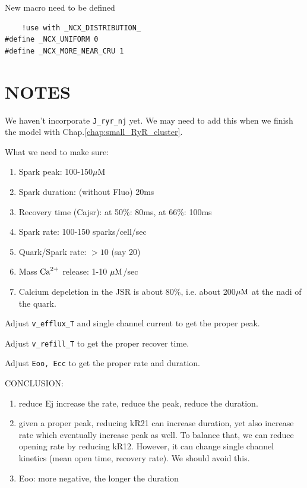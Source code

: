New macro need to be defined
\begin{verbatim}
    !use with _NCX_DISTRIBUTION_
#define _NCX_UNIFORM 0
#define _NCX_MORE_NEAR_CRU 1
\end{verbatim}


%     



\section{NOTES}

We haven't incorporate \verb!J_ryr_nj! yet. We may need to add this when we
finish the model with Chap.\ref{chap:small_RyR_cluster}.

What we need to make sure:
\begin{enumerate}
  \item Spark peak: 100-150$\mu$M
  \item Spark duration: (without Fluo) 20ms
  \item Recovery time (Cajsr): at 50\%: 80ms, at 66\%: 100ms
  \item Spark rate: 100-150 sparks/cell/sec
  \item Quark/Spark rate: $> 10$ (say 20)
  \item Mass ${\text{Ca}^{2+}}$ release: 1-10 ${\mu\text{M}}$/sec
  \item Calcium depeletion in the JSR is about 80\%, i.e. about 200${\mu\text{M}}$ at the
  nadi of the quark.
\end{enumerate}
Adjust \verb!v_efflux_T! and single channel current to get the proper peak.

Adjust \verb!v_refill_T! to get the proper recover time. 

Adjust \verb!Eoo, Ecc! to get the proper rate and duration. 

CONCLUSION:
\begin{enumerate}
  \item reduce Ej increase the rate, reduce the peak, reduce the
  duration. 
  \item given a proper peak, reducing kR21 can increase duration, yet also
  increase rate which eventually increase peak as well. To balance that, we can
  reduce opening rate by reducing kR12. However, it can change single channel
  kinetics (mean open time, recovery rate). We should avoid this. 
  \item Eoo: more negative, the longer the duration
  
\end{enumerate}


